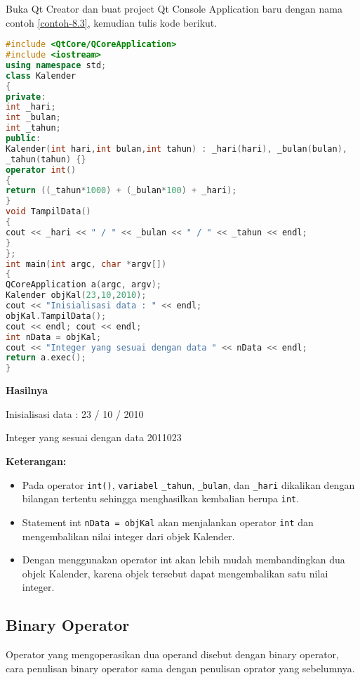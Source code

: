 Buka Qt Creator dan buat project Qt Console Application baru dengan nama
contoh \ref{contoh-8.3}, kemudian tulis kode berikut.

\begin{lstlisting}[language=c++, caption=Conversion Operator untuk konversi class Kalender ke integer, label=contoh-8.3]
#include <QtCore/QCoreApplication>
#include <iostream>
using namespace std;
class Kalender
{
private:
int _hari;
int _bulan;
int _tahun;
public:
Kalender(int hari,int bulan,int tahun) : _hari(hari), _bulan(bulan),
_tahun(tahun) {}
operator int()
{
return ((_tahun*1000) + (_bulan*100) + _hari);
}
void TampilData()
{
cout << _hari << " / " << _bulan << " / " << _tahun << endl;
}
};
int main(int argc, char *argv[])
{
QCoreApplication a(argc, argv);
Kalender objKal(23,10,2010);
cout << "Inisialisasi data : " << endl;
objKal.TampilData();
cout << endl; cout << endl;
int nData = objKal;
cout << "Integer yang sesuai dengan data " << nData << endl;
return a.exec();
}
\end{lstlisting}

\textbf{Hasilnya}
\begin{lcverbatim}
Inisialisasi data :
23 / 10 / 2010

Integer yang sesuai dengan data 2011023
\end{lcverbatim}


\textbf{Keterangan:}

\begin{itemize}

\item
  Pada operator \texttt{int()}, \texttt{variabel} \texttt{\_tahun},
  \texttt{\_bulan}, dan \texttt{\_hari} dikalikan dengan bilangan
  tertentu sehingga menghasilkan kembalian berupa \texttt{int}.
\item
  Statement int \texttt{nData\ =\ objKal} akan menjalankan operator
  \texttt{int} dan mengembalikan nilai integer dari objek Kalender.
\item
  Dengan menggunakan operator int akan lebih mudah membandingkan dua
  objek Kalender, karena objek tersebut dapat mengembalikan satu nilai
  integer.
\end{itemize}

\subsection{Binary Operator}\label{binary-operator}

Operator yang mengoperasikan dua operand disebut dengan binary operator,
cara penulisan binary operator sama dengan penulisan oprator yang
sebelumnya.


